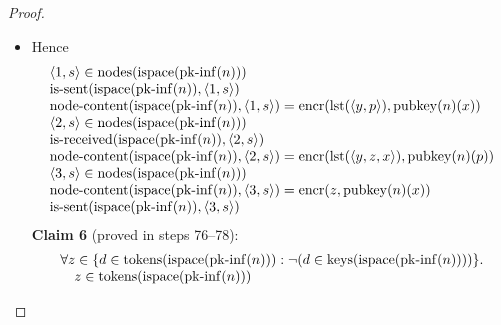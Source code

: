 \documentclass[11pt]{article}
\theoremstyle{plain}
\begin{document}
\begin{proof}
\begin{itemize}[leftmargin=2.8em, itemsep=4pt, parsep=1pt]
  \item[\textbf{67--75}] Hence 
\begin{equation*}
\begin{array}{@{}l@{}}
\langle 1, s \rangle \in \operatorname{nodes}(\operatorname{ispace}(\operatorname{pk\text{-}inf}(n))) \\
\operatorname{is\text{-}sent}(\operatorname{ispace}(\operatorname{pk\text{-}inf}(n)), \langle 1, s \rangle) \\
\operatorname{node\text{-}content}(\operatorname{ispace}(\operatorname{pk\text{-}inf}(n)), \langle 1, s \rangle) = \operatorname{encr}(\operatorname{lst}(\langle y, p \rangle), \operatorname{pubkey}(n)(x)) \\
\langle 2, s \rangle \in \operatorname{nodes}(\operatorname{ispace}(\operatorname{pk\text{-}inf}(n))) \\
\operatorname{is\text{-}received}(\operatorname{ispace}(\operatorname{pk\text{-}inf}(n)), \langle 2, s \rangle) \\
\operatorname{node\text{-}content}(\operatorname{ispace}(\operatorname{pk\text{-}inf}(n)), \langle 2, s \rangle) = \operatorname{encr}(\operatorname{lst}(\langle y, z, x \rangle), \operatorname{pubkey}(n)(p)) \\
\langle 3, s \rangle \in \operatorname{nodes}(\operatorname{ispace}(\operatorname{pk\text{-}inf}(n))) \\
\operatorname{node\text{-}content}(\operatorname{ispace}(\operatorname{pk\text{-}inf}(n)), \langle 3, s \rangle) = \operatorname{encr}(z, \operatorname{pubkey}(n)(x)) \\
\operatorname{is\text{-}sent}(\operatorname{ispace}(\operatorname{pk\text{-}inf}(n)), \langle 3, s \rangle)
\end{array}
\end{equation*}
\textbf{Claim 6} (proved in steps 76--78):
\begin{equation*}
\begin{array}{@{}l@{}} \forall z \in \{d \in \operatorname{tokens}(\operatorname{ispace}(\operatorname{pk\text{-}inf}(n))) : \neg (d \in \operatorname{keys}(\operatorname{ispace}(\operatorname{pk\text{-}inf}(n))))\}. \\ \quad z \in \operatorname{tokens}(\operatorname{ispace}(\operatorname{pk\text{-}inf}(n))) \end{array}
\end{equation*}


\end{itemize}
\end{proof}
\end{document}
